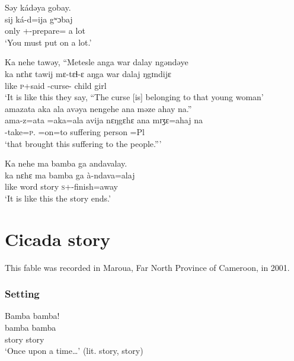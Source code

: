  \ea  Səy  kádəya  gobay.\\
 \gll sij ká-d=ija  gʷɔbaj\\
 only    {\twoS}+{\IFV}-prepare={\PLU}   {a lot}\\
 \glt ‘You must put on a lot.’\\
 \z
 
 \ea  Ka  nehe  tawəy,  “Metesle  anga  war  dalay  ngəndəye  \\
\gll ka  nɛhɛ  tawij  mɛ-tɛɬ-ɛ      aŋga  war    dalaj  ŋgɪndijɛ \\
 like  {\DEM}   \textsc{p}+said  {\NOM}{}-curse-{\CL}   {\POSS}   child  girl       {\DEM}      \\
 \glt ‘It is like this they say, “The curse [is] belonging to that young woman’\\
 
 \medskip
  amazata  aka  ala  avəya  nengehe  ana  məze  ahay  na.”\\
\gll ama-z=ata      =aka=ala      avija    nɛŋgɛhɛ  ana    mɪʒɛ=ahaj   na\\
 {\DEP}-take=\textsc{p}.{\IO}   =on=to  suffering  {\DEM}      {\DAT} person    =Pl  {\PSP}\\
 \glt ‘that brought this suffering to the people.”’ 
 \z

 \ea  Ka  nehe  ma  bamba  ga  andavalay.    \\
 \gll ka  nɛhɛ  ma  bamba   ga  à-ndava=alaj\\
 like  {\DEM}  word   story     {\ADJ}     \textsc{s}+{\PFV}-finish=away \\
 \glt ‘It is like this the story ends.’  
 \z
 
% 
\section[Cicada story]{Cicada story\\\hspace{1.5em} \textnormal{}}\setcounter{equation}{0}\label{sec:1.6}
\hypertarget{RefHeading1210361525720847}{}
This fable was recorded in Maroua, Far North Province of Cameroon, in 2001.  
% 
\subsubsection*{Setting}
\ea   Bamba  bamba!\\
\gll bamba   bamba\\
	        story         story   \\
\glt ‘Once upon a time…’ (lit. story, story)
 \z

